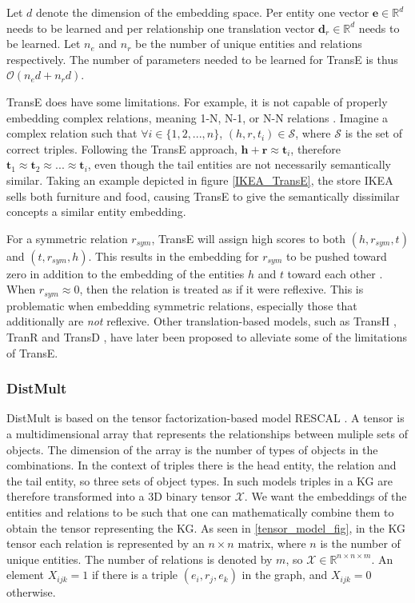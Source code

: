 Let $d$ denote the dimension of the embedding space. Per entity one vector $\textbf{e}\in \mathbb{R}^d$ needs to be learned and per relationship one translation vector $\textbf{d}_r\in \mathbb{R}^d$ needs to be learned. Let $n_e$ and $n_r$ be the number of unique entities and relations respectively. The number of parameters needed to be learned for TransE is thus $\mathcal{O}(n_e d + n_r d)$.


TransE does have some limitations. For example, it is not capable of properly embedding complex relations, meaning 1-N, N-1, or N-N relations \cite{transH, transR}. Imagine a complex relation such that $\forall i \in \{1,2, ..., n\}$, $(h, r, t_i )\in \mathcal{S}$, where $\mathcal{S}$ is the set of correct triples. Following the TransE approach, $\textbf{h}+\textbf{r}\approx \textbf{t}_i$, therefore $\textbf{t}_1 \approx \textbf{t}_2 \approx ... \approx \textbf{t}_i$, even though the tail entities are not necessarily semantically similar. Taking an example depicted in figure \ref{IKEA_TransE}, the store IKEA sells both furniture and food, causing TransE to give the semantically dissimilar concepts a similar entity embedding. 

For a symmetric relation $r_{sym}$, TransE will assign high scores to both $(h, r_{sym}, t)$ and $(t, r_{sym}, h)$. This results in the embedding for $r_{sym}$ to be pushed toward zero in addition to the embedding of the entities $h$ and $t$ toward each other \cite{wang2018evaluating}. When $r_{sym} \approx 0$, then the relation is treated as if it were reflexive. This is problematic when embedding symmetric relations, especially those that additionally are \textit{not} reflexive. Other translation-based models, such as TransH \cite{transH}, TranR \cite{transR} and TransD \cite{transD}, have later been proposed to alleviate some of the limitations of TransE.

\subsubsection{DistMult}
DistMult is based on the tensor factorization-based model RESCAL \cite{RESCAL}. A tensor is a multidimensional array that represents the relationships between muliple sets of objects. The dimension of the array is the number of types of objects in the combinations. In the context of triples there is the head entity, the relation and the tail entity, so three sets of object types. In such models triples in a KG are therefore transformed into a 3D binary tensor $\mathcal{X}$. We want the embeddings of the entities and relations to be such that one can mathematically combine them to obtain the tensor representing the KG. As seen in \cref{tensor_model_fig}, in the KG tensor each relation is represented by an $n \times n$ matrix, where $n$ is the number of unique entities. The number of relations is denoted by $m$, so $\mathcal{X}\in \mathbb{R}^{n \times n \times m}$. An element $X_{ijk} = 1$ if there is a triple $(e_i, r_j, e_k)$ in the graph, and $X_{ijk} = 0$ otherwise.

